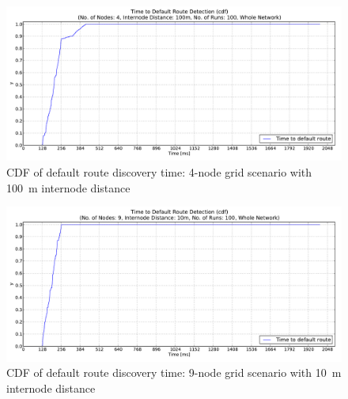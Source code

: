 \begin{figure}[htb]
  \begin{center}
  \vspace{-20pt}
    \leavevmode
      \includegraphics[scale=0.38]
      {Pics/results/4/MRHOF/grid/dist100_montecarlo_cdf_hist.pdf}
   \caption{CDF of default route discovery time: 4-node grid scenario with 100~m internode distance}
   \label{fig:4_MRHOF_grid_100_cdf}
  \end{center}
\end{figure}

\begin{figure}[htpb]
  \begin{center}
   \vspace{-20pt}
    \leavevmode
      \includegraphics[scale=0.38]
      {Pics/results/9/MRHOF/grid/dist10_montecarlo_cdf_hist.pdf}
   \caption{CDF of default route discovery time: 9-node grid scenario with 10~m internode distance}
   \label{fig:9_MRHOF_grid_10_cdf}
  \end{center}
\end{figure}

